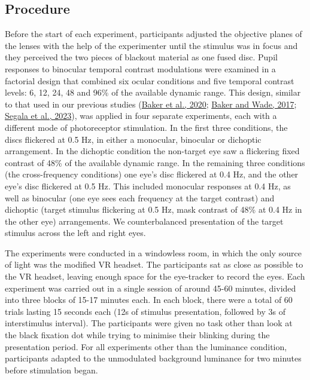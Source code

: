 \documentclass[
]{article}
\begin{document}
\hypertarget{procedure}{%
\subsection{Procedure}\label{procedure}}

Before the start of each experiment, participants adjusted the objective planes of the lenses with the help of the experimenter until the stimulus was in focus and they perceived the two pieces of blackout material as one fused disc. Pupil responses to binocular temporal contrast modulations were examined in a factorial design that combined six ocular conditions and five temporal contrast levels: 6, 12, 24, 48 and 96\% of the available dynamic range. This design, similar to that used in our previous studies (\protect\hyperlink{ref-Baker2020}{Baker et al., 2020}; \protect\hyperlink{ref-Baker2017}{Baker and Wade, 2017}; \protect\hyperlink{ref-Segala2023}{Segala et al., 2023}), was applied in four separate experiments, each with a different mode of photoreceptor stimulation. In the first three conditions, the discs flickered at 0.5 Hz, in either a monocular, binocular or dichoptic arrangement. In the dichoptic condition the non-target eye saw a flickering fixed contrast of 48\% of the available dynamic range. In the remaining three conditions (the cross-frequency conditions) one eye's disc flickered at 0.4 Hz, and the other eye's disc flickered at 0.5 Hz. This included monocular responses at 0.4 Hz, as well as binocular (one eye sees each frequency at the target contrast) and dichoptic (target stimulus flickering at 0.5 Hz, mask contrast of 48\% at 0.4 Hz in the other eye) arrangements. We counterbalanced presentation of the target stimulus across the left and right eyes.

The experiments were conducted in a windowless room, in which the only source of light was the modified VR headset. The participants sat as close as possible to the VR headset, leaving enough space for the eye-tracker to record the eyes. Each experiment was carried out in a single session of around 45-60 minutes, divided into three blocks of 15-17 minutes each. In each block, there were a total of 60 trials lasting 15 seconds each (12s of stimulus presentation, followed by 3s of interstimulus interval). The participants were given no task other than look at the black fixation dot while trying to minimise their blinking during the presentation period. For all experiments other than the luminance condition, participants adapted to the unmodulated background luminance for two minutes before stimulation began.
\end{document}
